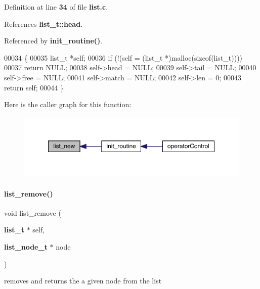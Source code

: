 Definition at line \textbf{ 34} of file \textbf{ list.\+c}.



References \textbf{ list\+\_\+t\+::head}.



Referenced by \textbf{ init\+\_\+routine()}.


\begin{DoxyCode}
00034                    \{
00035   list_t *\textcolor{keyword}{self};
00036   \textcolor{keywordflow}{if} (!(\textcolor{keyword}{self} = (list_t *)malloc(\textcolor{keyword}{sizeof}(list_t))))
00037     \textcolor{keywordflow}{return} NULL;
00038   \textcolor{keyword}{self}->head = NULL;
00039   \textcolor{keyword}{self}->tail = NULL;
00040   \textcolor{keyword}{self}->free = NULL;
00041   \textcolor{keyword}{self}->match = NULL;
00042   \textcolor{keyword}{self}->len = 0;
00043   \textcolor{keywordflow}{return} \textcolor{keyword}{self};
00044 \}
\end{DoxyCode}
Here is the caller graph for this function\+:\nopagebreak
\begin{figure}[H]
\begin{center}
\leavevmode
\includegraphics[width=350pt]{list_8c_a9dd3eafdb56dcc64689f78fb4acdff3f_icgraph}
\end{center}
\end{figure}
\mbox{\label{list_8c_a5ef7843a8a481124bce3e93541ba379a}} 
\paragraph{list\+\_\+remove()}
{\footnotesize\ttfamily void list\+\_\+remove (\begin{DoxyParamCaption}\item[{\textbf{ list\+\_\+t} $\ast$}]{self,  }\item[{\textbf{ list\+\_\+node\+\_\+t} $\ast$}]{node }\end{DoxyParamCaption})}



removes and returns the a given node from the list 


